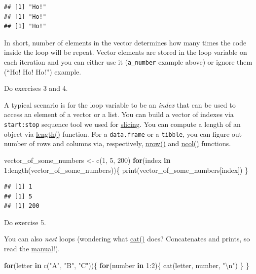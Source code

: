 \documentclass[
]{book}
\newenvironment{Shaded}{\begin{snugshade}}{\end{snugshade}}
\newcommand{\ControlFlowTok}[1]{\textcolor[rgb]{0.13,0.29,0.53}{\textbf{#1}}}
\newcommand{\DecValTok}[1]{\textcolor[rgb]{0.00,0.00,0.81}{#1}}
\newcommand{\FunctionTok}[1]{\textcolor[rgb]{0.00,0.00,0.00}{#1}}
\newcommand{\NormalTok}[1]{#1}
\newcommand{\OtherTok}[1]{\textcolor[rgb]{0.56,0.35,0.01}{#1}}
\newcommand{\SpecialCharTok}[1]{\textcolor[rgb]{0.00,0.00,0.00}{#1}}
\newcommand{\StringTok}[1]{\textcolor[rgb]{0.31,0.60,0.02}{#1}}
\begin{document}
\begin{verbatim}
## [1] "Ho!"
## [1] "Ho!"
## [1] "Ho!"
\end{verbatim}

In short, number of elements in the vector determines how many times the code inside the loop will be repeat. Vector elements are stored in the loop variable on each iteration and you can either use it (\texttt{a\_number} example above) or ignore them (``Ho! Ho! Ho!'') example.

Do exercises 3 and 4.

A typical scenario is for the loop variable to be an \emph{index} that can be used to access an element of a vector or a list. You can build a vector of indexes via \texttt{start:stop} sequence tool we used for \protect\hyperlink{vector-index-slicing}{slicing}. You can compute a length of an object via \href{https://stat.ethz.ch/R-manual/R-devel/library/base/html/length.html}{length()} function. For a \texttt{data.frame} or a \texttt{tibble}, you can figure out number of rows and columns via, respectively, \href{https://stat.ethz.ch/R-manual/R-devel/library/base/html/nrow.html}{nrow()} and \href{https://stat.ethz.ch/R-manual/R-devel/library/base/html/nrow.html}{ncol()} functions.

\begin{Shaded}
\begin{Highlighting}[]
\NormalTok{vector\_of\_some\_numbers }\OtherTok{\textless{}{-}} \FunctionTok{c}\NormalTok{(}\DecValTok{1}\NormalTok{, }\DecValTok{5}\NormalTok{, }\DecValTok{200}\NormalTok{)}
\ControlFlowTok{for}\NormalTok{(index }\ControlFlowTok{in} \DecValTok{1}\SpecialCharTok{:}\FunctionTok{length}\NormalTok{(vector\_of\_some\_numbers))\{}
  \FunctionTok{print}\NormalTok{(vector\_of\_some\_numbers[index])}
\NormalTok{\}}
\end{Highlighting}
\end{Shaded}

\begin{verbatim}
## [1] 1
## [1] 5
## [1] 200
\end{verbatim}

Do exercise 5.

You can also \emph{nest} loops (wondering what \href{https://stat.ethz.ch/R-manual/R-devel/library/base/html/cat.html}{cat()} does? Concatenates and prints, so read the \href{https://stat.ethz.ch/R-manual/R-devel/library/base/html/cat.html}{manual}!).

\begin{Shaded}
\begin{Highlighting}[]
\ControlFlowTok{for}\NormalTok{(letter }\ControlFlowTok{in} \FunctionTok{c}\NormalTok{(}\StringTok{"A"}\NormalTok{, }\StringTok{"B"}\NormalTok{, }\StringTok{"C"}\NormalTok{))\{}
  \ControlFlowTok{for}\NormalTok{(number }\ControlFlowTok{in} \DecValTok{1}\SpecialCharTok{:}\DecValTok{2}\NormalTok{)\{}
    \FunctionTok{cat}\NormalTok{(letter, number, }\StringTok{"}\SpecialCharTok{\textbackslash{}n}\StringTok{"}\NormalTok{)}
\NormalTok{  \}}
\NormalTok{\}}
\end{Highlighting}
\end{Shaded}
\end{document}
